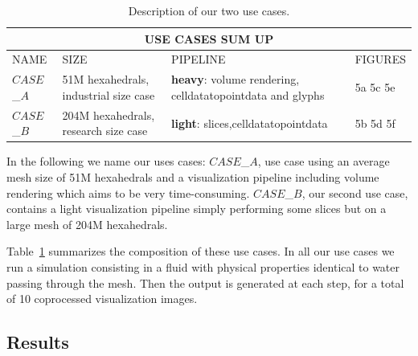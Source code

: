\begin{table}
\centering
\begin{tabular}{|p{1.5cm}|p{3.0cm}|p{2.70cm}|p{1.50cm}|}
\hline
\multicolumn{4}{|c|}{\textbf{USE CASES SUM UP}}\\
\hline
NAME & SIZE & PIPELINE & FIGURES \\
\hline
$CASE$\_$A$ & 51M hexahedrals, \newline industrial size case & \textbf{heavy}:
\newline volume rendering, \newline celldatatopointdata \newline and glyphs  &
5a 5c 5e\\
\hline
$CASE$\_$B$ & 204M hexahedrals, \newline research size case & \textbf{light}:
\newline 9 slices,\newline celldatatopointdata  & 5b 5d 5f   \\
\hline
\end{tabular}
\caption{Description of our two use cases.}
\label{fig:tab}
\vspace{-0.15in}
\end{table}
In the following we name our uses cases:
$CASE$\_$A$, use case using an average mesh size of 51M hexahedrals and a
visualization pipeline including volume rendering which aims to be very time-consuming.
$CASE$\_$B$, our second use case, contains a light visualization pipeline simply
performing some slices but on a large mesh of 204M hexahedrals.

Table~\ref{fig:tab} summarizes the composition of these use cases. In all our use cases we
run a simulation consisting in a fluid with physical properties identical to
water passing through the mesh. Then the output is generated at each step, for a
total of 10 coprocessed visualization images.

\subsection{Results}

